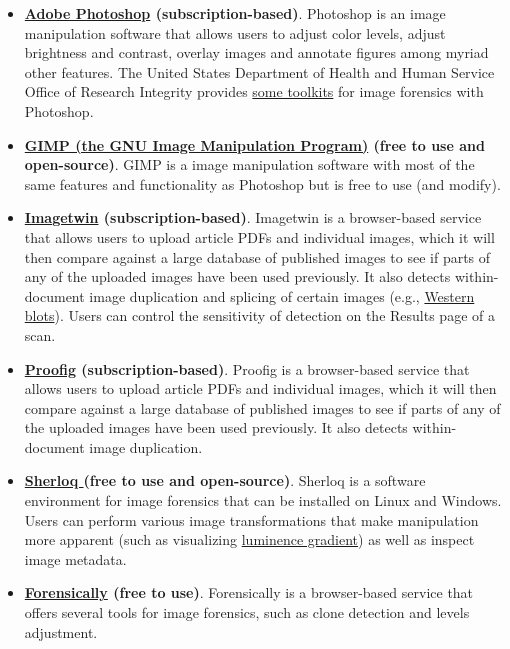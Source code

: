 \documentclass[letterpaper, 12pt]{article}
\begin{document}
\begin{itemize}
    \setlength\itemsep{-0.5em}
    \item \textbf{\href{https://www.adobe.com/products/photoshop.html}{Adobe Photoshop} (subscription-based)}. Photoshop is an image manipulation software that allows users to adjust color levels, adjust brightness and contrast, overlay images and annotate figures among myriad other features. The United States Department of Health and Human Service Office of Research Integrity provides \href{https://ori.hhs.gov/advanced-forensic-actions}{some toolkits} for image forensics with Photoshop.
    \item \textbf{\href{https://www.gimp.org/}{GIMP (the GNU Image Manipulation Program)} (free to use and open-source)}. GIMP is a image manipulation software with most of the same features and functionality as Photoshop but is free to use (and modify).
    \item \textbf{\href{https://imagetwin.ai/}{Imagetwin} (subscription-based)}. Imagetwin is a browser-based service that allows users to upload article PDFs and individual images, which it will then compare against a large database of published images to see if parts of any of the uploaded images have been used previously. It also detects within-document image duplication and splicing of certain images (e.g., \href{https://en.wikipedia.org/wiki/Western_blot}{Western blots}). Users can control the sensitivity of detection on the Results page of a scan.
    \item \textbf{\href{https://www.proofig.com/}{Proofig} (subscription-based)}. Proofig is a browser-based service that allows users to upload article PDFs and individual images, which it will then compare against a large database of published images to see if parts of any of the uploaded images have been used previously. It also detects within-document image duplication.
    \item \textbf{\href{https://github.com/GuidoBartoli/sherloq}{Sherloq } (free to use and open-source)}. Sherloq is a software environment for image forensics that can be installed on Linux and Windows. Users can perform various image transformations that make manipulation more apparent (such as visualizing \href{https://en.wikipedia.org/wiki/Image_gradient}{luminence gradient}) as well as inspect image metadata.
    \item \textbf{\href{https://29a.ch/photo-forensics/}{Forensically} (free to use)}. Forensically is a browser-based service that offers several tools for image forensics, such as clone detection and levels adjustment.

\end{itemize}
\end{document}
